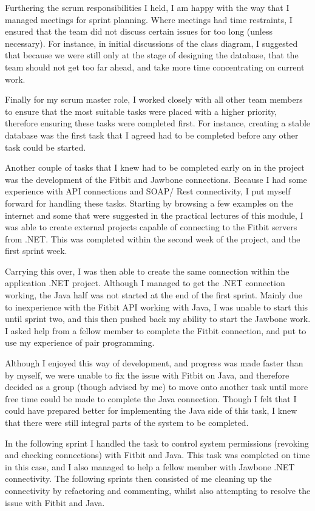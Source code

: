 Furthering the scrum responsibilities I held, I am happy with the way that I managed meetings for sprint planning. Where meetings had time restraints, I ensured that the team did not discuss certain issues for too long (unless necessary). For instance, in initial discussions of the class diagram, I suggested that because we were still only at the stage of designing the database, that the team should not get too far ahead, and take more time concentrating on current work. \par
Finally for my scrum master role, I worked closely with all other team members to ensure that the most suitable tasks were placed with a higher priority, therefore ensuring these tasks were completed first. For instance, creating a stable database was the first task that I agreed had to be completed before any other task could be started.\par
Another couple of tasks that I knew had to be completed early on in the project was the development of the Fitbit and Jawbone connections. Because I had some experience with API connections and SOAP/ Rest connectivity, I put myself forward for handling these tasks. Starting by browsing a few examples on the internet and some that were suggested in the practical lectures of this module, I was able to create external projects capable of connecting to the Fitbit servers from .NET. This was completed within the second week of the project, and the first sprint week. \par
Carrying this over, I was then able to create the same connection within the application .NET project. Although I managed to get the .NET connection working, the Java half was not started at the end of the first sprint. Mainly due to inexperience with the Fitbit API working with Java, I was unable to start this until sprint two, and this then pushed back my ability to start the Jawbone work. I asked help from a fellow member to complete the Fitbit connection, and put to use my experience of pair programming. \par
Although I enjoyed this way of development, and progress was made faster than by myself, we were unable to fix the issue with Fitbit on Java, and therefore decided as a group (though advised by me) to move onto another task until more free time could be made to complete the Java connection. Though I felt that I could have prepared better for implementing the Java side of this task, I knew that there were still integral parts of the system to be completed. \par
In the following sprint I handled the task to control system permissions (revoking and checking connections) with Fitbit and Java. This task was completed on time in this case, and I also managed to help a fellow member with Jawbone .NET connectivity. The following sprints then consisted of me cleaning up the connectivity by refactoring and commenting, whilst also attempting to resolve the issue with Fitbit and Java. \par
